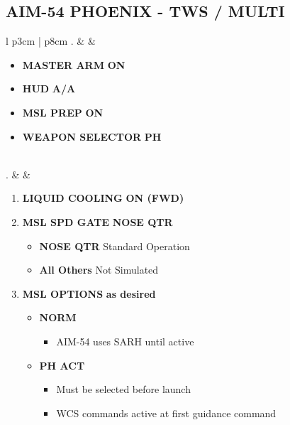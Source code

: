 \documentclass[8pt,usenames,dvipsnames,twoside]{article}
\begin{document}
		\subsection{AIM-54 PHOENIX - TWS / MULTI}
		\begin{center}
			\begin{tabular}{l p{3cm} | p{8cm}}
				. &  & 
				\begin{minipage}[t]{\linewidth}
					\vspace{-7pt}
					\begin{itemize}
						\item \textbf{MASTER ARM} \dotfill \textbf{ON}
						\item \textbf{HUD} \dotfill \textbf{A/A}
						\item \textbf{MSL PREP} \dotfill \textbf{ON}
						\item \textbf{WEAPON SELECTOR} \dotfill \textbf{PH}
					\end{itemize} 
				\end{minipage} \\
				. &  & 
				\begin{minipage}[t]{\linewidth}
					\vspace{-7pt}
					\begin{enumerate}[label=(\alph*)]
						\item \textbf{LIQUID COOLING} \dotfill \textbf{ON (FWD)}
						\item \textbf{MSL SPD GATE} \dotfill \textbf{NOSE QTR}
						\begin{itemize}
							\item \textbf{NOSE QTR} Standard Operation
							\item \textbf{All Others} Not Simulated
						\end{itemize}
						\item \textbf{MSL OPTIONS} \dotfill \textbf{as desired}
						\begin{itemize}
							\item \textbf{NORM}
							\begin{itemize}
								\item AIM-54 uses SARH until active
							\end{itemize}
							\item \textbf{PH ACT}
							\begin{itemize}
								\item Must be selected before launch
								\item WCS commands active at first guidance command

\end{itemize}
\end{itemize}
\end{enumerate}
\end{minipage}
\end{tabular}
\end{center}
\end{document}
